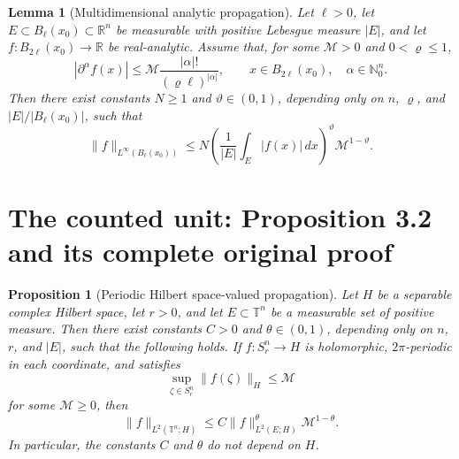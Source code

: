 \documentclass[10pt,a4paper]{amsart}
\theoremstyle{plain}
\theoremstyle{remark}
\theoremstyle{definition}
\theoremstyle{plain}
\newtheorem{lemma}{Lemma}
\newtheorem{proposition}{Proposition}
\begin{document}
\begin{lemma}[Multidimensional analytic propagation]
\label{thm:scalar-propagation}
Let \(\ell>0\), let \(E\subset B_\ell(x_0)\subset\mathbb R^n\) be measurable with positive Lebesgue measure \(|E|\), and let \(f:B_{2\ell}(x_0)\to\mathbb R\) be real-analytic. Assume that, for some \(\mathcal M>0\) and \(0<\varrho\le1\),
\[
|\partial^\alpha f(x)|
\le \mathcal M\frac{|\alpha|!}{(\varrho\ell)^{|\alpha|}},
\qquad x\in B_{2\ell}(x_0),\quad \alpha\in\mathbb N_0^n.
\]
Then there exist constants \(N\ge1\) and \(\vartheta\in(0,1)\), depending only on \(n\), \(\varrho\), and \(|E|/|B_\ell(x_0)|\), such that
\[
\|f\|_{L^\infty(B_\ell(x_0))}
\le N
\left(\frac1{|E|}\int_E|f(x)|\,dx\right)^\vartheta
\mathcal M^{1-\vartheta}.
\]
\end{lemma}


\section{The counted unit: Proposition 3.2 and its complete original proof}

\begin{proposition}[Periodic Hilbert space-valued propagation]
\label{prop:hilbert-propagation}
Let \(H\) be a separable complex Hilbert space, let \(r>0\), and let \(E\subset\mathbb T^n\) be a measurable set of positive measure. Then there exist constants \(C>0\) and \(\theta\in(0,1)\), depending only on \(n\), \(r\), and \(|E|\), such that the following holds. If \(f:S_r^n\to H\) is holomorphic, \(2\pi\)-periodic in each coordinate, and satisfies
\[
\sup_{\zeta\in S_r^n}\|f(\zeta)\|_H\le\mathcal M
\]
for some \(\mathcal M\ge0\), then
\begin{equation}\label{eq:hilbert-propagation}
\|f\|_{L^2(\mathbb T^n;H)}
\le C
\|f\|_{L^2(E;H)}^\theta
\mathcal M^{1-\theta}.
\end{equation}
In particular, the constants \(C\) and \(\theta\) do not depend on \(H\).
\end{proposition}
\end{document}
